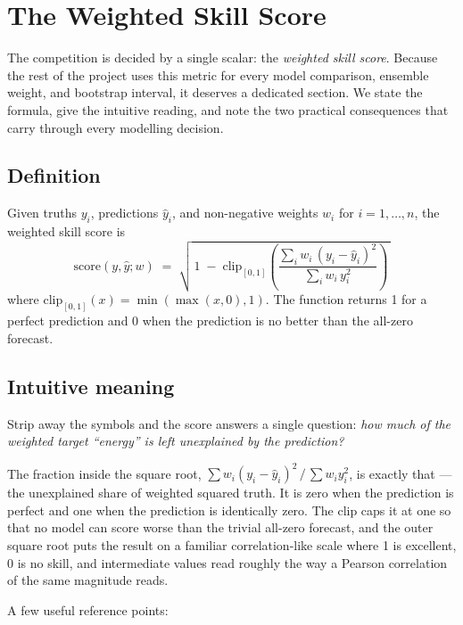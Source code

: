 \section{The Weighted Skill Score}
\label{sec:skill}

The competition is decided by a single scalar: the \emph{weighted skill score}. Because the rest of the project uses this metric for every model comparison, ensemble weight, and bootstrap interval, it deserves a dedicated section. We state the formula, give the intuitive reading, and note the two practical consequences that carry through every modelling decision.

\subsection{Definition}

Given truths $y_i$, predictions $\hat y_i$, and non-negative weights $w_i$ for $i = 1, \ldots, n$, the weighted skill score is
\begin{equation}
\label{eq:skill}
  \text{score}(y, \hat y; w) \;=\; \sqrt{\,1 \;-\; \mathrm{clip}_{[0,1]}\!\left( \dfrac{\sum_{i} w_i\,(y_i - \hat y_i)^2}{\sum_{i} w_i\,y_i^2} \right)\,}
\end{equation}
where $\mathrm{clip}_{[0,1]}(x) = \min(\max(x,0),1)$. The function returns 1 for a perfect prediction and 0 when the prediction is no better than the all-zero forecast.

\subsection{Intuitive meaning}

Strip away the symbols and the score answers a single question: \emph{how much of the weighted target ``energy'' is left unexplained by the prediction?}

The fraction inside the square root, $\sum w_i (y_i - \hat y_i)^2 \,/\, \sum w_i y_i^2$, is exactly that --- the unexplained share of weighted squared truth. It is zero when the prediction is perfect and one when the prediction is identically zero. The clip caps it at one so that no model can score worse than the trivial all-zero forecast, and the outer square root puts the result on a familiar correlation-like scale where 1 is excellent, 0 is no skill, and intermediate values read roughly the way a Pearson correlation of the same magnitude reads.

A few useful reference points:

